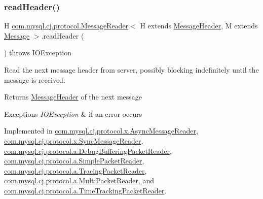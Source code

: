 \subsubsection{\texorpdfstring{read\+Header()}{readHeader()}}
{\footnotesize\ttfamily H \mbox{\hyperlink{interfacecom_1_1mysql_1_1cj_1_1protocol_1_1_message_reader}{com.\+mysql.\+cj.\+protocol.\+Message\+Reader}}$<$ H extends \mbox{\hyperlink{interfacecom_1_1mysql_1_1cj_1_1protocol_1_1_message_header}{Message\+Header}}, M extends \mbox{\hyperlink{interfacecom_1_1mysql_1_1cj_1_1protocol_1_1_message}{Message}} $>$.read\+Header (\begin{DoxyParamCaption}{ }\end{DoxyParamCaption}) throws I\+O\+Exception}

Read the next message header from server, possibly blocking indefinitely until the message is received.

\begin{DoxyReturn}{Returns}
\mbox{\hyperlink{interfacecom_1_1mysql_1_1cj_1_1protocol_1_1_message_header}{Message\+Header}} of the next message 
\end{DoxyReturn}

\begin{DoxyExceptions}{Exceptions}
{\em I\+O\+Exception} & if an error occurs \\
\hline
\end{DoxyExceptions}


Implemented in \mbox{\hyperlink{classcom_1_1mysql_1_1cj_1_1protocol_1_1x_1_1_async_message_reader_a6c755b53680af84a699114422348db84}{com.\+mysql.\+cj.\+protocol.\+x.\+Async\+Message\+Reader}}, \mbox{\hyperlink{classcom_1_1mysql_1_1cj_1_1protocol_1_1x_1_1_sync_message_reader_a057a4fcddafa78836d874a30205936fc}{com.\+mysql.\+cj.\+protocol.\+x.\+Sync\+Message\+Reader}}, \mbox{\hyperlink{classcom_1_1mysql_1_1cj_1_1protocol_1_1a_1_1_debug_buffering_packet_reader_a59ead81a6bb0f0b358f9e44db6b63280}{com.\+mysql.\+cj.\+protocol.\+a.\+Debug\+Buffering\+Packet\+Reader}}, \mbox{\hyperlink{classcom_1_1mysql_1_1cj_1_1protocol_1_1a_1_1_simple_packet_reader_a2f65d760ce356bbb432f3d8e804a24bc}{com.\+mysql.\+cj.\+protocol.\+a.\+Simple\+Packet\+Reader}}, \mbox{\hyperlink{classcom_1_1mysql_1_1cj_1_1protocol_1_1a_1_1_tracing_packet_reader_a67550eb953a1d19c2ea8663e2336e2a3}{com.\+mysql.\+cj.\+protocol.\+a.\+Tracing\+Packet\+Reader}}, \mbox{\hyperlink{classcom_1_1mysql_1_1cj_1_1protocol_1_1a_1_1_multi_packet_reader_a6a0250ba430aacfb45f8e1c0a7907465}{com.\+mysql.\+cj.\+protocol.\+a.\+Multi\+Packet\+Reader}}, and \mbox{\hyperlink{classcom_1_1mysql_1_1cj_1_1protocol_1_1a_1_1_time_tracking_packet_reader_aa49a24bf628c8b096b222c6516cb04b3}{com.\+mysql.\+cj.\+protocol.\+a.\+Time\+Tracking\+Packet\+Reader}}.

